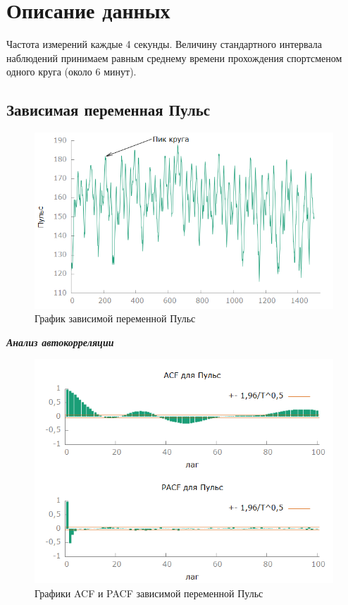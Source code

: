 \documentclass[a4paper,12pt]{article}
\begin{document}

\tableofcontents
\pagebreak

\section{Описание данных}
Частота измерений каждые 4 секунды. Величину стандартного интервала наблюдений принимаем равным среднему времени прохождения спортсменом одного круга (около 6 минут).


\subsection{Зависимая переменная Пульс}
\begin{figure}[H]
	\centering
	\includegraphics[width=0.7\linewidth]{../[graphics]/hr_graph}
	\caption{График зависимой переменной Пульс}
	\label{fig:hr_graph}
\end{figure}

\textbf{\textit{Анализ автокорреляции}}

\begin{figure}[H]
	\centering
	\includegraphics[width=0.7\linewidth]{../[graphics]/hr_acf_100}
	\caption{Графики ACF и PACF зависимой переменной Пульс}
	\label{fig:hr_acf_100}
\end{figure}
\end{document}
